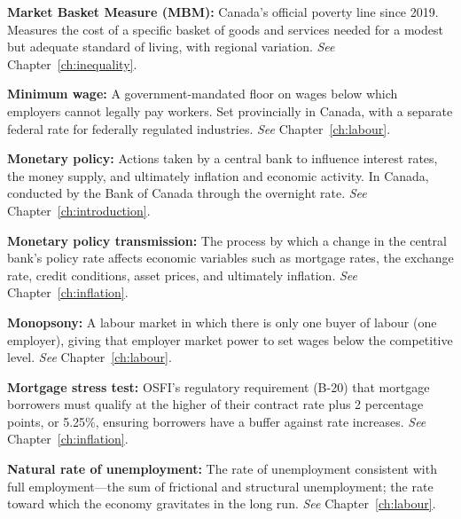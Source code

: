 \vspace{6pt}
\noindent\textbf{Market Basket Measure (MBM):} Canada's official poverty line since 2019. Measures the cost of a specific basket of goods and services needed for a modest but adequate standard of living, with regional variation. \textit{See} Chapter~\ref{ch:inequality}.

\vspace{6pt}
\noindent\textbf{Minimum wage:} A government-mandated floor on wages below which employers cannot legally pay workers. Set provincially in Canada, with a separate federal rate for federally regulated industries. \textit{See} Chapter~\ref{ch:labour}.

\vspace{6pt}
\noindent\textbf{Monetary policy:} Actions taken by a central bank to influence interest rates, the money supply, and ultimately inflation and economic activity. In Canada, conducted by the Bank of Canada through the overnight rate. \textit{See} Chapter~\ref{ch:introduction}.

\vspace{6pt}
\noindent\textbf{Monetary policy transmission:} The process by which a change in the central bank's policy rate affects economic variables such as mortgage rates, the exchange rate, credit conditions, asset prices, and ultimately inflation. \textit{See} Chapter~\ref{ch:inflation}.

\vspace{6pt}
\noindent\textbf{Monopsony:} A labour market in which there is only one buyer of labour (one employer), giving that employer market power to set wages below the competitive level. \textit{See} Chapter~\ref{ch:labour}.

\vspace{6pt}
\noindent\textbf{Mortgage stress test:} OSFI's regulatory requirement (B-20) that mortgage borrowers must qualify at the higher of their contract rate plus 2 percentage points, or 5.25\%, ensuring borrowers have a buffer against rate increases. \textit{See} Chapter~\ref{ch:inflation}.

\vspace{6pt}
\noindent\textbf{Natural rate of unemployment:} The rate of unemployment consistent with full employment---the sum of frictional and structural unemployment; the rate toward which the economy gravitates in the long run. \textit{See} Chapter~\ref{ch:labour}.

